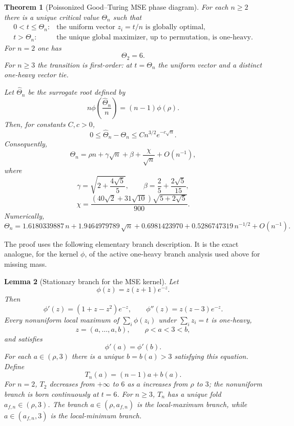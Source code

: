 \documentclass[11pt]{article}
\newtheorem{theorem}{Theorem}[section]
\newtheorem{lemma}[theorem]{Lemma}
\theoremstyle{definition}
\begin{document}
\begin{theorem}[Poissonized Good--Turing MSE phase diagram]\label{thm:gt-mse-phase}
For each $n\ge2$ there is a unique critical value $\Theta_n$ such that
\[
\begin{array}{ll}
0<t\le \Theta_n: & \text{the uniform vector } z_i=t/n \text{ is globally optimal},\\[1mm]
t>\Theta_n: & \text{the unique global maximizer, up to permutation, is one-heavy.}
\end{array}
\]
For $n=2$ one has
\[
  \Theta_2=6.
\]
For $n\ge3$ the transition is first-order: at $t=\Theta_n$ the uniform vector and a distinct one-heavy vector tie.

Let $\widehat\Theta_n$ be the surrogate root defined by
\[
  n\phi\left(\frac{\widehat\Theta_n}{n}\right)=(n-1)\phi(\rho).
\]
Then, for constants $C,c>0$,
\[
  0\le \widehat\Theta_n-\Theta_n\le C n^{3/2}e^{-c\sqrt n}.
\]
Consequently,
\[
  \Theta_n
  =\rho n+\gamma\sqrt n+\beta+\frac{\chi}{\sqrt n}+O(n^{-1}),
\]
where
\[
  \gamma=\sqrt{2+\frac{4\sqrt5}{5}},
  \qquad
  \beta=\frac25+\frac{2\sqrt5}{15},
\]
\[
  \chi=\frac{(40\sqrt2+31\sqrt{10})\sqrt{5+2\sqrt5}}{900}.
\]
Numerically,
\[
  \Theta_n
  =1.6180339887\,n+1.9464979789\,\sqrt n
   +0.6981423970+0.5286747319\,n^{-1/2}+O(n^{-1}).
\]
\end{theorem}

The proof uses the following elementary branch description.  It is the exact analogue, for the kernel $\phi$, of the active one-heavy branch analysis used above for missing mass.

\begin{lemma}[Stationary branch for the MSE kernel]\label{lem:gt-branch}
Let
\[
  \phi(z)=z(z+1)e^{-z}.
\]
Then
\[
  \phi'(z)=(1+z-z^2)e^{-z},
  \qquad
  \phi''(z)=z(z-3)e^{-z}.
\]
Every nonuniform local maximum of $\sum_i\phi(z_i)$ under $\sum_i z_i=t$ is one-heavy,
\[
  z=(a,\ldots,a,b),\qquad \rho<a<3<b,
\]
and satisfies
\[
  \phi'(a)=\phi'(b).
\]
For each $a\in(\rho,3)$ there is a unique $b=b(a)>3$ satisfying this equation.  Define
\[
  T_n(a)=(n-1)a+b(a).
\]
For $n=2$, $T_2$ decreases from $+\infty$ to $6$ as $a$ increases from $\rho$ to $3$; the nonuniform branch is born continuously at $t=6$.  For $n\ge3$, $T_n$ has a unique fold $a_{f,n}\in(\rho,3)$.  The branch $a\in(\rho,a_{f,n})$ is the local-maximum branch, while $a\in(a_{f,n},3)$ is the local-minimum branch.
\end{lemma}
\end{document}

